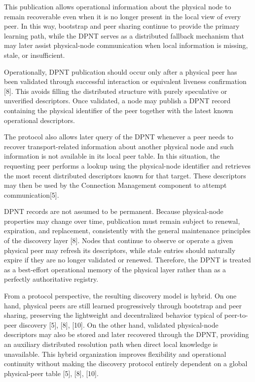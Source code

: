 \documentclass[12pt,a4paper]{article}
\begin{document}
This publication allows operational information about the physical node to remain recoverable even when it is no longer present in the local view of every peer. In this way, bootstrap and peer sharing continue to provide the primary learning path, while the DPNT serves as a distributed fallback mechanism that may later assist physical-node communication when local information is missing, stale, or insufficient.

Operationally, DPNT publication should occur only after a physical peer has been validated through successful interaction or equivalent liveness confirmation [8]. This avoids filling the distributed structure with purely speculative or unverified descriptors. Once validated, a node may publish a DPNT record containing the physical identifier of the peer together with the latest known operational descriptors. 

The protocol also allows later query of the DPNT whenever a peer needs to recover transport-related information about another physical node and such information is not available in its local peer table. In this situation, the requesting peer performs a lookup using the physical-node identifier and retrieves the most recent distributed descriptors known for that target. These descriptors may then be used by the Connection Management component to attempt  communication[5].

DPNT records are not assumed to be permanent. Because physical-node properties may change over time, publication must remain subject to renewal, expiration, and replacement, consistently with the general maintenance principles of the discovery layer [8]. Nodes that continue to observe or operate a given physical peer may refresh its descriptors, while stale entries should naturally expire if they are no longer validated or renewed. Therefore, the DPNT is treated as a best-effort operational memory of the physical layer rather than as a perfectly authoritative registry.

From a protocol perspective, the resulting discovery model is hybrid. On one hand, physical peers are still learned progressively through bootstrap and peer sharing, preserving the lightweight and decentralized behavior typical of peer-to-peer discovery [5], [8], [10]. On the other hand, validated physical-node descriptors may also be stored and later recovered through the DPNT, providing an auxiliary distributed resolution path when direct local knowledge is unavailable. This hybrid organization improves flexibility and operational continuity without making the discovery protocol entirely dependent on a global physical-peer table [5], [8], [10].
\end{document}
